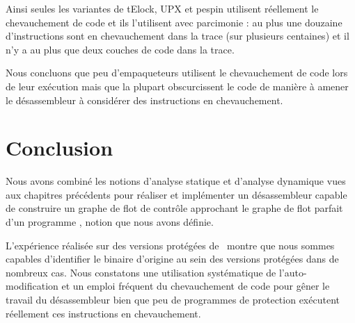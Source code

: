 Ainsi seules les variantes de tElock, UPX et pespin utilisent réellement le chevauchement de code et ils l'utilisent avec parcimonie : au plus une douzaine d'instructions sont en chevauchement dans la trace (sur plusieurs centaines) et il n'y a au plus que deux couches de code dans la trace.

Nous concluons que peu d'empaqueteurs utilisent le chevauchement de code lors de leur exécution mais que la plupart obscurcissent le code de manière à amener le désassembleur à considérer des instructions en chevauchement.



\section*{Conclusion}
Nous avons combiné les notions d'analyse statique et d'analyse dynamique vues aux chapitres précédents pour réaliser et implémenter un désassembleur capable de construire un graphe de flot de contrôle approchant le graphe de flot parfait d'un programme \sm, notion que nous avons définie.

L'expérience réalisée sur des versions protégées de \hostname\ montre que nous sommes capables d'identifier le binaire d'origine au sein des versions protégées dans de nombreux cas. Nous constatons une utilisation systématique de l'auto-modification et un emploi fréquent du chevauchement de code pour gêner le travail du désassembleur bien que peu de programmes de protection exécutent réellement ces instructions en chevauchement.

